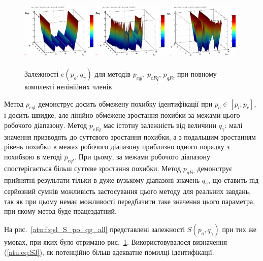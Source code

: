 \documentclass[a4paper,13pt]{atuaref}
\begin{document}
\begin{figure}[htb!]
  \centerline{
    \includegraphics[width=0.32\textwidth]{p3/p/qls_pe-p_po_qg_eql_all.png}
    \hfill
    \includegraphics[width=0.32\textwidth]{p3/p/qls_pe-p_po_qg_eFq_all.png}
    \hfill
    \includegraphics[width=0.32\textwidth]{p3/p/qls_pe-p_po_qg_eFc_all.png}
  }
  \caption{Залежності $e(p_o,q_\gamma)$ для методів $p_{eql}$, $p_{eFq}$, $p_{qFc}$ при повному комплекті нелінійних членів}
  \label{atu:f:qsl_pe_po_qg_all}
\end{figure}

Метод $p_{eql}$ демонструє досить обмежену похибку ідентифікації при
$ p_o \in [p_l; p_r] $, і досить швидке, але лінійно обмежене зростання похибки за
межами цього робочого діапазону. Метод $ p_{eFq} $ має істотну залежність
від величини $ q_\gamma $: малі значення призводять до суттєвого
зростання похибки, а з подальшим зростанням рівень похибки в межах робочого
діапазону приблизно одного порядку з похибкою в методі $ p_{eql} $. При
цьому, за межами робочого діапазону спостерігається більш суттєве зростання
похибки. Метод $ p_ {qFc} $ демонструє прийнятні результати тільки в дуже
вузькому діапазоні значень $ q_\gamma $, що ставить під серйозний сумнів
можливість застосування цього методу для реальних завдань, так як при цьому
немає можливості передбачити таке значення цього параметра, при якому метод буде
працездатний.

На рис.~\ref{atu:f:qsl_S_po_qg_all} представлені залежності
$ S (p_o, q_\gamma) $
при тих же умовах, при яких було отримано рис.~\ref{atu:f:qsl_pe_po_qg_all}.
Використовувалося визначення (\ref{atu:eq:S3}), як
потенційно більш адекватне помилці ідентифікації.
\end{document}
